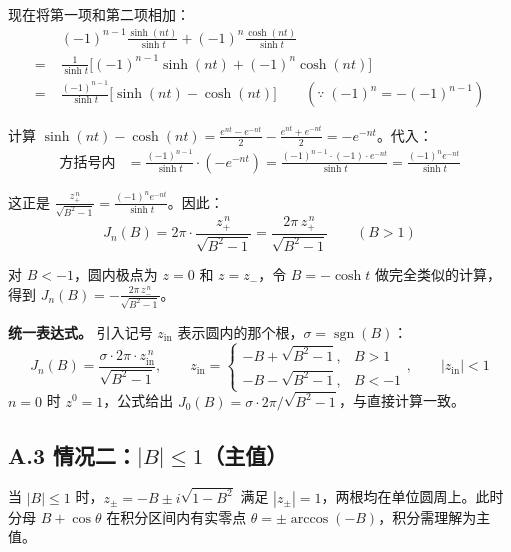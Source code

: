 \documentclass[12pt,a4paper]{ctexart}
\begin{document}
现在将第一项和第二项相加：
\begin{equation}
\begin{aligned}
&\;(-1)^{n-1}\frac{\sinh(nt)}{\sinh t}+(-1)^n\frac{\cosh(nt)}{\sinh t} \\[4pt]
=&\;\frac{1}{\sinh t}\Big[(-1)^{n-1}\sinh(nt)+(-1)^n\cosh(nt)\Big] \\[4pt]
=&\;\frac{(-1)^{n-1}}{\sinh t}\Big[\sinh(nt)-\cosh(nt)\Big]
\qquad(\because\;(-1)^n=-(-1)^{n-1})
\end{aligned}
\end{equation}

计算 $\sinh(nt)-\cosh(nt)=\frac{e^{nt}-e^{-nt}}{2}-\frac{e^{nt}+e^{-nt}}{2}=-e^{-nt}$。代入：
\begin{equation}
\begin{aligned}
\text{方括号内}&=\frac{(-1)^{n-1}}{\sinh t}\cdot(-e^{-nt})
                =\frac{(-1)^{n-1}\cdot(-1)\cdot e^{-nt}}{\sinh t}
                =\frac{(-1)^n e^{-nt}}{\sinh t}
\end{aligned}
\end{equation}

这正是 $\frac{z_+^{\,n}}{\sqrt{B^2-1}}=\frac{(-1)^n e^{-nt}}{\sinh t}$。因此：
\begin{equation}
J_n(B)=2\pi\cdot\frac{z_+^{\,n}}{\sqrt{B^2-1}}=\frac{2\pi\,z_+^{\,n}}{\sqrt{B^2-1}}\qquad(B>1)
\end{equation}

对 $B<-1$，圆内极点为 $z=0$ 和 $z=z_-$，令 $B=-\cosh t$ 做完全类似的计算，得到
$J_n(B)=-\frac{2\pi\,z_-^{\,n}}{\sqrt{B^2-1}}$。

\medskip
\noindent\textbf{统一表达式。}
引入记号 $z_{\text{in}}$ 表示圆内的那个根，$\sigma=\operatorname{sgn}(B)$：
\begin{equation}
\boxed{J_n(B)=\frac{\sigma\cdot2\pi\cdot z_{\text{in}}^{\,n}}{\sqrt{B^2-1}},\qquad
z_{\text{in}}=\begin{cases}
-B+\sqrt{B^2-1},&B>1\\
-B-\sqrt{B^2-1},&B<-1
\end{cases},\qquad|z_{\text{in}}|<1}
\end{equation}
$n=0$ 时 $z^0=1$，公式给出 $J_0(B)=\sigma\cdot2\pi/\sqrt{B^2-1}$，与直接计算一致。

\subsection*{A.3 情况二：$|B|\leq1$（主值）}

当 $|B|\leq1$ 时，$z_{\pm}=-B\pm i\sqrt{1-B^2}$ 满足 $|z_{\pm}|=1$，两根均在单位圆周上。此时分母
$B+\cos\theta$ 在积分区间内有实零点 $\theta=\pm\arccos(-B)$，积分需理解为主值。
\end{document}

